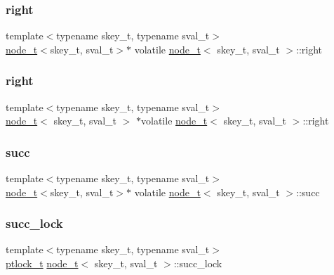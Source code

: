 \subsubsection{\texorpdfstring{right}{right}\hspace{0.1cm}{\footnotesize\ttfamily [1/2]}}
{\footnotesize\ttfamily template$<$typename skey\+\_\+t, typename sval\+\_\+t$>$ \\
\hyperlink{structnode__t}{node\+\_\+t}$<$skey\+\_\+t, sval\+\_\+t$>$$\ast$ volatile \hyperlink{structnode__t}{node\+\_\+t}$<$ skey\+\_\+t, sval\+\_\+t $>$\+::right}

\mbox{\label{structnode__t_ae2a246fc0c98ee4bec4e69cad2f4ba3c}} 
\subsubsection{\texorpdfstring{right}{right}\hspace{0.1cm}{\footnotesize\ttfamily [2/2]}}
{\footnotesize\ttfamily template$<$typename skey\+\_\+t, typename sval\+\_\+t$>$ \\
\hyperlink{structnode__t}{node\+\_\+t}$<$ skey\+\_\+t, sval\+\_\+t $>$ $\ast$volatile \hyperlink{structnode__t}{node\+\_\+t}$<$ skey\+\_\+t, sval\+\_\+t $>$\+::right}

\mbox{\label{structnode__t_aad0b9c0571665e0a5811f9f3d683b76e}} 
\subsubsection{\texorpdfstring{succ}{succ}}
{\footnotesize\ttfamily template$<$typename skey\+\_\+t, typename sval\+\_\+t$>$ \\
\hyperlink{structnode__t}{node\+\_\+t}$<$skey\+\_\+t, sval\+\_\+t$>$$\ast$ volatile \hyperlink{structnode__t}{node\+\_\+t}$<$ skey\+\_\+t, sval\+\_\+t $>$\+::succ}

\mbox{\label{structnode__t_afeeaa8165d380652af96618f36213252}} 
\subsubsection{\texorpdfstring{succ\+\_\+lock}{succ\_lock}}
{\footnotesize\ttfamily template$<$typename skey\+\_\+t, typename sval\+\_\+t$>$ \\
\hyperlink{ccavl__impl_8h_a61cf36cb33c84af9c784f95686701a94}{ptlock\+\_\+t} \hyperlink{structnode__t}{node\+\_\+t}$<$ skey\+\_\+t, sval\+\_\+t $>$\+::succ\+\_\+lock}

